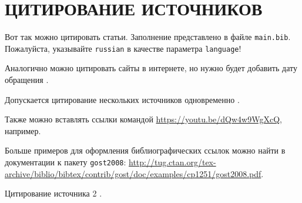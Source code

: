 \section{ЦИТИРОВАНИЕ ИСТОЧНИКОВ}

Вот так \cite{Article} можно цитировать статьи. 
Заполнение представлено в файле \texttt{main.bib}. 
Пожалуйста, указывайте \texttt{russian} в качестве параметра \texttt{language}!

Аналогично можно цитировать сайты в интернете, но нужно будет добавить 
дату обращения \cite{Wikipedia}.

Допускается цитирование нескольких источников одновременно \cite{cite_1_2, cite_1_15, cite_1_16}.

Также можно вставлять ссылки командой \url{https://youtu.be/dQw4w9WgXcQ}, например.

Больше примеров для оформления библиографических ссылок можно найти в 
документации к пакету \texttt{gost2008}: 
\url{http://tug.ctan.org/tex-archive/biblio/bibtex/contrib/gost/doc/examples/cp1251/gost2008.pdf}.

Цитирование источника 2 \cite{cite_1_11}.

